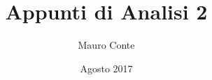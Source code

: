 \documentclass[a4paper,14pt]{book}
\begin{document}
		
\newtheorem{definition}{Definizione}
\newtheorem{proposition}{Proposizione}
\newtheorem{theorem}{Teorema}
\newtheorem{observation}{Osservazione}
\newtheorem{corollary}{Corollario}
\newtheorem{example}{Esempio}

\newcommand{\norm}[1] {\left\|#1\right\|}
\newcommand{\abs}[1] {\left|#1\right|}

\newcommand{\bbset}[1] {\mathbb{#1}}
\newcommand{\bbsetn}[2] {\mathbb{#1}^{#2}}

\newcommand{\realintervalopen}[2] {\left]#1,#2\right[}
\newcommand{\realintervalclose}[2] {\left[#1,#2\right]}
\newcommand{\realintervalclor}[2] {\left[#1,#2\right]}
\newcommand{\realintervalolcr}[2] {\left[#1,#2\right]}
\newcommand{\realfunction}[3]{ #1:#2\to#3}
\newcommand{\trigonpol}[3] {\frac{a_0}{2}+\sum\limits_{#1=#2}^{#3}a_{#1}cos(#1x)+b_{#1}sin(#1x)}

\newcommand{\dinfty}[2]{d_\infty\left(#1,#2\right)}
\newcommand{\ddinfty}[3]{\sup\limits_{x\in#3}{\left|f-g\right|}}
\newcommand{\sse}{\Leftrightarrow}

\author{Mauro Conte}
\title{Appunti di Analisi 2}
\date{Agosto 2017}

\frontmatter
\maketitle
\tableofcontents

\mainmatter








\backmatter
\end{document}
